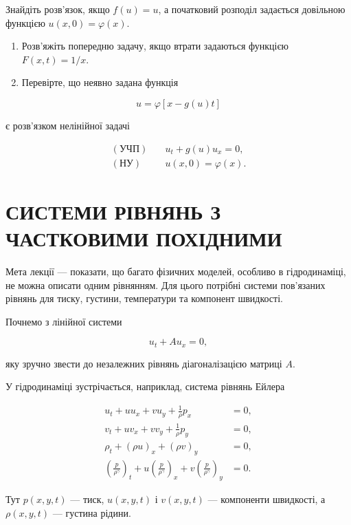 \documentclass[
  ukrainian,
]{article}
\begin{document}
Знайдіть розв'язок, якщо \(f(u)=u\), а початковий розподіл задається
довільною функцією \(u(x,0)=\varphi(x)\).

\begin{enumerate}
\def\labelenumi{\arabic{enumi}.}
\setcounter{enumi}{3}
\item
  Розв'яжіть попередню задачу, якщо втрати задаються функцією
  \(F(x,t)=1/x\).
\item
  Перевірте, що неявно задана функція
\end{enumerate}

\[
u = \varphi[x-g(u)t]
\]

є розв'язком нелінійної задачі

\[
\begin{aligned}
(\text{УЧП})\quad & u_t + g(u)u_x = 0,\\
(\text{НУ})\quad & u(x,0)=\varphi(x).
\end{aligned}
\]

\section{СИСТЕМИ РІВНЯНЬ З ЧАСТКОВИМИ
ПОХІДНИМИ}\label{ux441ux438ux441ux442ux435ux43cux438-ux440ux456ux432ux43dux44fux43dux44c-ux437-ux447ux430ux441ux442ux43aux43eux432ux438ux43cux438-ux43fux43eux445ux456ux434ux43dux438ux43cux438}

Мета лекції --- показати, що багато фізичних моделей, особливо в
гідродинаміці, не можна описати одним рівнянням. Для цього потрібні
системи пов'язаних рівнянь для тиску, густини, температури та компонент
швидкості.

Почнемо з лінійної системи

\[
u_t + A u_x = 0,
\]

яку зручно звести до незалежних рівнянь діагоналізацією матриці \(A\).

У гідродинаміці зустрічається, наприклад, система рівнянь Ейлера

\[
\begin{aligned}
u_t + uu_x + vu_y + \frac{1}{\rho}p_x &= 0,\\
v_t + uv_x + vv_y + \frac{1}{\rho}p_y &= 0,\\
\rho_t + (\rho u)_x + (\rho v)_y &= 0,\\
\left(\frac{p}{\rho^\gamma}\right)_t
+ u\left(\frac{p}{\rho^\gamma}\right)_x
+ v\left(\frac{p}{\rho^\gamma}\right)_y &= 0.
\end{aligned}
\]

Тут \(p(x,y,t)\) --- тиск, \(u(x,y,t)\) і \(v(x,y,t)\) --- компоненти
швидкості, а \(\rho(x,y,t)\) --- густина рідини.
\end{document}
